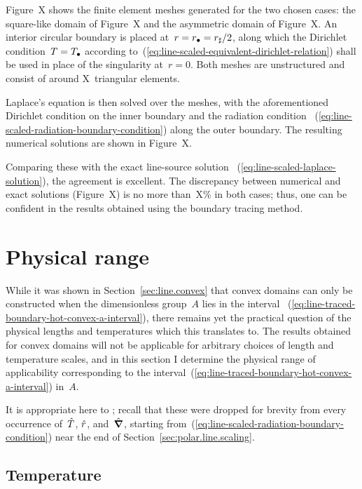 Figure~X shows the finite element meshes generated %
for the two chosen cases:
the square-like domain of Figure~X %
and the asymmetric domain of Figure~X. %
An interior circular boundary is placed at~$r = r_\bullet = r_\sharp / 2$,
along which the Dirichlet condition~$T = T_\bullet$
according to~(\ref{eq:line-scaled-equivalent-dirichlet-relation})
shall be used
in place of the singularity at~$r = 0$.
Both meshes are unstructured
and consist of around X~triangular elements. %

Laplace's equation is then solved over the meshes,
with the aforementioned Dirichlet condition on the inner boundary
and the radiation condition~%
  (\ref{eq:line-scaled-radiation-boundary-condition})
along the outer boundary.
The resulting numerical solutions are shown in Figure~X. %

Comparing these with the exact line-source solution~%
  (\ref{eq:line-scaled-laplace-solution}),
the agreement is excellent.
The discrepancy between numerical and exact solutions
(Figure~X) %
is no more than~X\% in both cases; %
thus, one can be confident in the results obtained
using the boundary tracing method.

\section{Physical range}
\label{sec:line.physical}

While it was shown in Section~\ref{sec:line.convex} that
convex domains can only be constructed
when the dimensionless group~$A$ lies in the interval~%
  (\ref{eq:line-traced-boundary-hot-convex-a-interval}),
there remains yet the practical question of
the physical lengths and temperatures which this translates to.
The results obtained for convex domains
will not be applicable for arbitrary choices
of length and temperature scales,
and in this section I determine the physical range of applicability
corresponding to
the interval~(\ref{eq:line-traced-boundary-hot-convex-a-interval}) in~$A$.

It is appropriate here to ;
recall that these were dropped for brevity
from every occurrence of~$\hat{T}$, $\hat{r}$, and~$\mathop{}\!\hat{\mathop{}\!\boldsymbol{\mathbf{\nabla}}}$,
starting from~(\ref{eq:line-scaled-radiation-boundary-condition})
near the end of Section~\ref{sec:polar.line.scaling}.

\subsection{Temperature}
\label{sec:line.physical.temperature}


